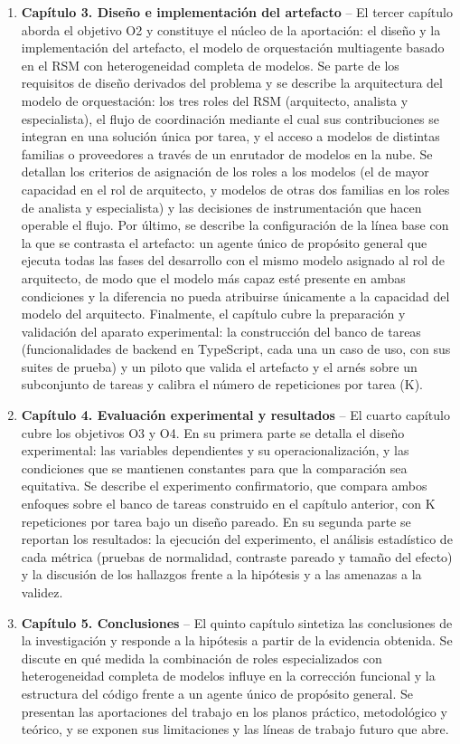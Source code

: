 \begin{enumerate}
  \item \textbf{Capítulo 3. Diseño e implementación del artefacto} --
    El tercer capítulo aborda el objetivo O2 y constituye el núcleo de la aportación: el diseño y la implementación del artefacto, el modelo de orquestación multiagente basado en el RSM con heterogeneidad completa de modelos. Se parte de los requisitos de diseño derivados del problema y se describe la arquitectura del modelo de orquestación: los tres roles del RSM (arquitecto, analista y especialista), el flujo de coordinación mediante el cual sus contribuciones se integran en una solución única por tarea, y el acceso a modelos de distintas familias o proveedores a través de un enrutador de modelos en la nube. Se detallan los criterios de asignación de los roles a los modelos (el de mayor capacidad en el rol de arquitecto, y modelos de otras dos familias en los roles de analista y especialista) y las decisiones de instrumentación que hacen operable el flujo. Por último, se describe la configuración de la línea base con la que se contrasta el artefacto: un agente único de propósito general que ejecuta todas las fases del desarrollo con el mismo modelo asignado al rol de arquitecto, de modo que el modelo más capaz esté presente en ambas condiciones y la diferencia no pueda atribuirse únicamente a la capacidad del modelo del arquitecto. Finalmente, el capítulo cubre la preparación y validación del aparato experimental: la construcción del banco de tareas (funcionalidades de backend en TypeScript, cada una un caso de uso, con sus suites de prueba) y un piloto que valida el artefacto y el arnés sobre un subconjunto de tareas y calibra el número de repeticiones por tarea (K).

  \item \textbf{Capítulo 4. Evaluación experimental y resultados} --
    El cuarto capítulo cubre los objetivos O3 y O4. En su primera parte se detalla el diseño experimental: las variables dependientes y su operacionalización, y las condiciones que se mantienen constantes para que la comparación sea equitativa. Se describe el experimento confirmatorio, que compara ambos enfoques sobre el banco de tareas construido en el capítulo anterior, con K repeticiones por tarea bajo un diseño pareado. En su segunda parte se reportan los resultados: la ejecución del experimento, el análisis estadístico de cada métrica (pruebas de normalidad, contraste pareado y tamaño del efecto) y la discusión de los hallazgos frente a la hipótesis y a las amenazas a la validez.

  \item \textbf{Capítulo 5. Conclusiones} --
    El quinto capítulo sintetiza las conclusiones de la investigación y responde a la hipótesis a partir de la evidencia obtenida. Se discute en qué medida la combinación de roles especializados con heterogeneidad completa de modelos influye en la corrección funcional y la estructura del código frente a un agente único de propósito general. Se presentan las aportaciones del trabajo en los planos práctico, metodológico y teórico, y se exponen sus limitaciones y las líneas de trabajo futuro que abre.
\end{enumerate}
